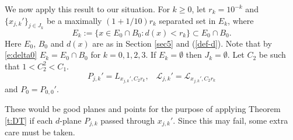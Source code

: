 \documentclass[11pt]{amsart}
\newcommand{\LL}{{\mathcal L}}
\newcommand{\rf}[1]{{(\ref{#1})}}
\newcommand{\Bl}{\color{blue}}
\theoremstyle{definition}
\theoremstyle{remark}
\numberwithin{equation}{section}
\newcommand{\xavi}[1]{}%
\begin{document}
We now apply this result to our situation. For $k\geq0$, let $r_{k}=10^{-k}$ and $\{x_{j,k}'\}_{j\in J_{k}}$ be a maximally $(1+1/10)r_{k}$ separated set in $E_{k}$, where
\begin{equation}\label{def-E_k}
E_{k}:=\{x\in E_{0}\cap B_{0} :d(x)< r_{k}\}\subset E_{0}\cap B_{0}.
\end{equation}
Here $E_0$, $B_0$ and $d(x)$ are as in Section \ref{sec5} and \rf{def-d}.
 Note that by \eqref{e:delta0} %
 $E_k=E_0\cap B_0$ for $k=0,1,2,3$. If $E_k=\emptyset$ then $J_k=\emptyset$.
 Let $C_2$ be such that $1<C_{2}^2<C_{1}$.
\begin{equation}\label{coice-x'}
P_{j,k}'=L_{x_{j,k}',C_{2} r_{k}}, \;\;\; \LL_{j,k}'=\LL_{x_{j,k}',C_{2} r_{k}}
\end{equation}
and $P_{0}=P_{0,0}'$. 

These would be good planes and points for the purpose of applying Theorem \ref{t:DT} if each $d$-plane $P_{j,k}$ passed through  $x_{j,k}'$. Since this may fail, some extra care must be taken. 
\end{document}
